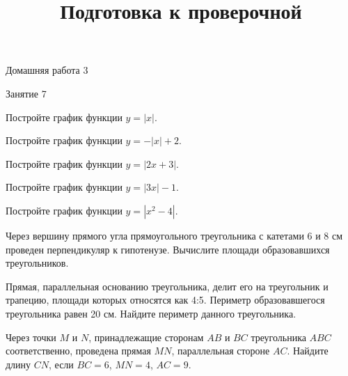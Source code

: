 \begin{homework}[number=3]
	\begin{listofex}
		\item Домашняя работа 3
	\end{listofex}
\end{homework}

\begin{class}[number=7]
	\title{Подготовка к проверочной}
	\begin{listofex}
		\item Занятие 7
	\end{listofex}
\end{class}


\begin{consultation}[number=7]
	\begin{listofex}
		\item Постройте график функции \( y=|x| \).
		\item Постройте график функции \( y=-|x|+2 \).
		\item Постройте график функции \( y=|2x+3| \).
		\item Постройте график функции \( y=|3x|-1 \).
		\item Постройте график функции \( y=|x^{2}-4| \).
		\item Через вершину прямого угла прямоугольного треугольника с катетами 6 и 8 см проведен перпендикуляр к гипотенузе. Вычислите площади образовавшихся треугольников.
		\item Прямая, параллельная основанию треугольника, делит его на треугольник и трапецию, площади которых относятся как 4:5. Периметр образовавшегося треугольника равен 20 см. Найдите периметр данного треугольника.
		\item Через точки \( M \) и \( N \), принадлежащие сторонам \( AB \) и \( BC \) треугольника \( ABC \) соответственно, проведена прямая \( MN \), параллельная стороне \( AC \). Найдите длину \( CN \), если \( BC = 6 \), \( MN = 4 \), \( AC = 9 \).
	\end{listofex}
\end{consultation}

